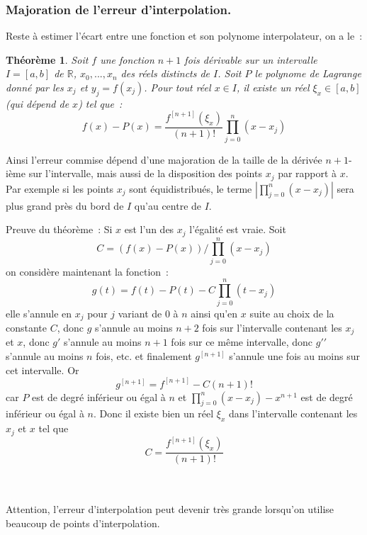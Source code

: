 \documentclass[a4paper,11pt]{article}
\newtheorem{thm}{Théorème}
\newcommand{\R}{{\mathbb{R}}}
\begin{document}
\begin{giacjshere}
\subsubsection{Majoration de l'erreur d'interpolation.}
Reste \`a estimer l'\'ecart entre une fonction et son polynome
interpolateur, on a le~:
\begin{thm} 
Soit $f$ une fonction $n+1$ fois d\'erivable sur un intervalle $I=[a,b]$
de $\R$, $x_0,...,x_n$ des r\'eels distincts de $I$. 
Soit $P$ le polynome de Lagrange donn\'e par les $x_j$ et $y_j=f(x_j)$.
Pour tout r\'eel $x \in I$,
il existe un r\'eel $\xi_x \in [a,b]$ (qui d\'epend de $x$) tel
que~:
\begin{equation} \label{eq:lagrange}
 f(x)-P(x) = \frac{f^{[n+1]}(\xi_x)}{(n+1)!} \prod_{j=0}^n(x-x_j) 
\end{equation}
\end{thm}
Ainsi l'erreur commise d\'epend d'une majoration de la taille
de la d\'eriv\'ee $n+1$-i\`eme sur l'intervalle, mais aussi
de la disposition des points $x_j$ par rapport \`a $x$. Par exemple
si les points $x_j$ sont \'equidistribu\'es, le terme
$|\prod_{j=0}^n(x-x_j)|$ sera plus grand pr\`es du bord de $I$ qu'au
centre de $I$.

Preuve du th\'eor\`eme~: Si $x$ est l'un des $x_j$ l'égalité est vraie. Soit 
\[ C=(f(x)-P(x))/\prod_{j=0}^n(x-x_j) \]
on considère maintenant la fonction~:
\[ g(t)=f(t)-P(t) - C \prod_{j=0}^n(t-x_j) \]
elle s'annule en $x_j$ pour $j$ variant de 0 à $n$ ainsi qu'en $x$
suite au choix de la constante $C$, donc $g$ s'annule au moins $n+2$ fois
sur l'intervalle contenant les $x_j$ et $x$, donc $g'$ s'annule au moins
$n+1$ fois sur ce même intervalle, donc $g'{'}$ s'annule au moins
$n$ fois, etc. et finalement $g^{[n+1]}$ s'annule une fois
au moins sur cet intervalle. Or 
\[ g^{[n+1]} = f^{[n+1]} - C (n+1)!\]
car $P$ est de degré inférieur ou égal à $n$ 
et $ \prod_{j=0}^n(x-x_j) - x^{n+1}$ est de degré
inférieur ou égal à $n$. Donc il existe bien un réel $\xi_x$ dans
l'intervalle contenant les $x_j$ et $x$ tel que
\[ C=\frac{f^{[n+1]}(\xi_x)}{(n+1)!} \]
\\
\\


Attention, l'erreur d'interpolation peut devenir tr\`es grande
lorsqu'on utilise beaucoup de points d'interpolation.


\end{giacjshere}
\end{document}
